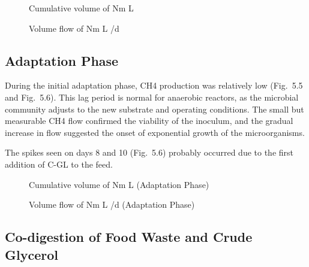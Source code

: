 \documentclass[12pt, a4paper, oneside]{report}
\begin{document}
\begin{figure}[H]
    \centering
    \caption{Cumulative volume of  Nm L}
    
\end{figure}

\begin{figure}[H]
    \centering
    \caption{Volume flow of  Nm L /d}
    
\end{figure}

\subsection{Adaptation Phase}

During the initial adaptation phase, CH4 production was relatively low (Fig. 5.5 and Fig. 5.6). This lag period is normal for anaerobic reactors, as the microbial community adjusts to the new substrate and operating conditions. The small but measurable CH4 flow confirmed the viability of the inoculum, and the gradual increase in flow suggested the onset of exponential growth of the microorganisms.

The spikes seen on days 8 and 10 (Fig. 5.6) probably occurred due to the first addition of C-GL to the feed.

\begin{figure}[H]
    \centering
    \caption{Cumulative volume of  Nm L (Adaptation Phase)}
    
\end{figure}

\begin{figure}[H]
    \centering
    \caption{Volume flow of  Nm L /d (Adaptation Phase)}
    
\end{figure}

\subsection{Co-digestion of Food Waste and Crude Glycerol}
\end{document}
